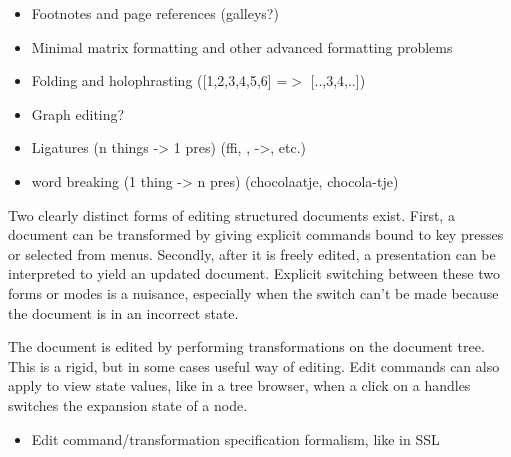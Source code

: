 

\begin{itemize}
\item Footnotes and page references (galleys?)
\item Minimal matrix formatting and other advanced formatting
          problems
\item Folding and holophrasting ([1,2,3,4,5,6] =$>$ [..,3,4,..])
\item Graph editing?
\item Ligatures (n things -> 1 pres) (ffi, \alpha, ->, etc.)
\item word breaking (1 thing -> n pres) (chocolaatje, chocola-tje)

\end{itemize}



\par Two clearly distinct forms of editing structured documents exist.
        First, a document can be transformed by giving explicit commands bound to key
        presses or selected from menus. Secondly, after it is freely edited, a presentation can be
        interpreted to yield an updated document. Explicit switching between
        these two forms or modes is a nuisance, especially when the switch can't be
        made because the document is in an incorrect state.

\par The document is edited by performing transformations on the document
        tree. This is a rigid, but in some cases useful way of editing. Edit commands
        can also apply to view state values, like in a tree browser, when a click on a
        handles switches the expansion state of a node. 
 \begin{itemize}
 
 \item Edit command/transformation specification formalism, like in
          SSL
 \end{itemize}


